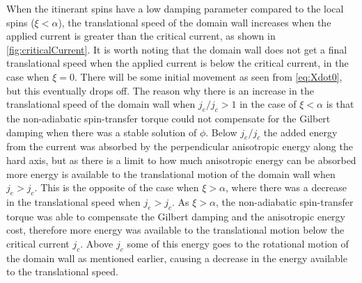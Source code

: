 \documentclass[12pt, a4paper, twoside, openright]{article}		%
\numberwithin{equation}{section}
\begin{document}
When the itinerant spins have a low damping parameter compared to the local spins ($\xi<\alpha$), the translational speed of the domain wall increases when the applied current is greater than the critical current, as shown in \ref{fig:criticalCurrent}. It is worth noting that the domain wall does not get a final translational speed when the applied current is below the critical current, in the case when $\xi=0$. There will be some initial movement as seen from \eqref{eq:Xdot0}, but this eventually drops off. The reason why there is an increase in the translational speed of the domain wall when $j_e/j_c>1$ in the case of $\xi<\alpha$ is that the non-adiabatic spin-transfer torque could not compensate for the Gilbert damping when there was a stable solution of $\phi$. Below $j_e/j_c$ the added energy from the current was absorbed by the perpendicular anisotropic energy along the hard axis, but as there is a limit to how much anisotropic energy can be absorbed more energy is available to the translational motion of the domain wall when $j_e>j_c$. This is the opposite of the case when $\xi>\alpha$, where there was a decrease in the translational speed when $j_e>j_c$. As $\xi>\alpha$, the non-adiabatic spin-transfer torque was able to compensate the Gilbert damping and the anisotropic energy cost, therefore more energy was available to the translational motion below the critical current $j_c$. Above $j_c$ some of this energy goes to the rotational motion of the domain wall as mentioned earlier, causing a decrease in the energy available to the translational speed.
\end{document}
